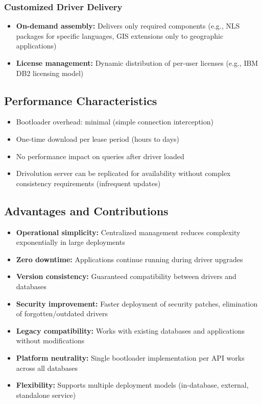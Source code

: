 \subsubsection{Customized Driver Delivery}

\begin{itemize}
    \item \textbf{On-demand assembly:} Delivers only required components (e.g., NLS packages for specific languages, GIS extensions only to geographic applications)
    \item \textbf{License management:} Dynamic distribution of per-user licenses (e.g., IBM DB2 licensing model)
\end{itemize}

\subsection{Performance Characteristics}

\begin{itemize}
    \item Bootloader overhead: minimal (simple connection interception)
    \item One-time download per lease period (hours to days)
    \item No performance impact on queries after driver loaded
    \item Drivolution server can be replicated for availability without complex consistency requirements (infrequent updates)
\end{itemize}

\subsection{Advantages and Contributions}

\begin{itemize}
    \item \textbf{Operational simplicity:} Centralized management reduces complexity exponentially in large deployments
    \item \textbf{Zero downtime:} Applications continue running during driver upgrades
    \item \textbf{Version consistency:} Guaranteed compatibility between drivers and databases
    \item \textbf{Security improvement:} Faster deployment of security patches, elimination of forgotten/outdated drivers
    \item \textbf{Legacy compatibility:} Works with existing databases and applications without modifications
    \item \textbf{Platform neutrality:} Single bootloader implementation per API works across all databases
    \item \textbf{Flexibility:} Supports multiple deployment models (in-database, external, standalone service)
\end{itemize}

